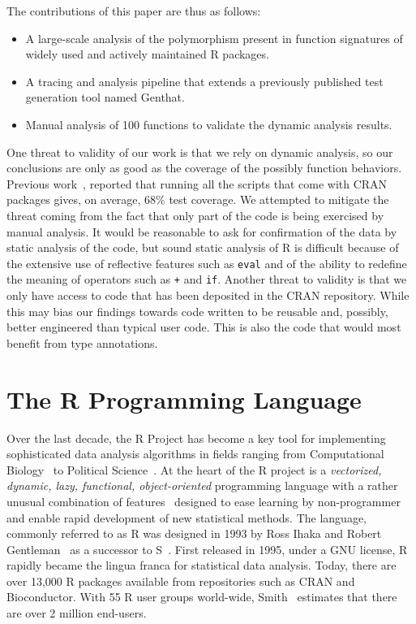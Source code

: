 \documentclass[acmsmall,10pt,review,anonymous]{acmart}\settopmatter{printfolios=true,printccs=false,printacmref=false}
\newcommand{\code}[1]{\lstinline|#1|\xspace}
\newcommand{\genthat}{{\sc Genthat}\xspace}
\begin{document}
The contributions of this paper are thus as follows:
\begin{itemize}
\item A large-scale analysis of the polymorphism present in function
  signatures of \PACKAGES widely used and actively maintained R packages.
\item A tracing and analysis pipeline that extends a previously published
  test generation tool named \genthat.
\item Manual analysis of 100 functions to validate the dynamic analysis
  results.
\end{itemize}

One threat to validity of our work is that we rely on dynamic analysis, so
our conclusions are only as good as the coverage of the possibly function
behaviors. Previous work~\cite{issta18}, reported that running all the
scripts that come with CRAN packages gives, on average, 68\% test coverage.
We attempted to mitigate the threat coming from the fact that only part of
the code is being exercised by manual analysis. It would be reasonable to
ask for confirmation of the data by static analysis of the code, but sound
static analysis of R is difficult because of the extensive use of reflective
features such as \code{eval} and of the ability to redefine the meaning of
operators such as \code{+} and \code{if}.  Another threat to validity is
that we only have access to code that has been deposited in the CRAN
repository. While this may bias our findings towards code written to be
reusable and, possibly, better engineered than typical user code. This is
also the code that would most benefit from type annotations.

\newpage  %

\section{The R Programming Language}\label{sec:rlang}

Over the last decade, the R Project has become a key tool for implementing
sophisticated data analysis algorithms in fields ranging from Computational
Biology~\cite{R05} to Political Science~\cite{R:Keele:2008}. At the heart of
the R project is a \emph{vectorized, dynamic, lazy, functional,
  object-oriented} programming language with a rather unusual combination of
features~\cite{ecoop12} designed to ease learning by non-programmer and
enable rapid development of new statistical methods.  The language, commonly
referred to as R was designed in 1993 by Ross Ihaka and Robert
Gentleman~\cite{R96} as a successor to S~\cite{S88}.  First released in
1995, under a GNU license, R rapidly became the lingua franca for
statistical data analysis. Today, there are over 13,000 R packages available
from repositories such as CRAN and Bioconductor.  With 55 R user groups
world-wide, Smith~\cite{eco11} estimates that there are over 2 million
end-users.
\end{document}
